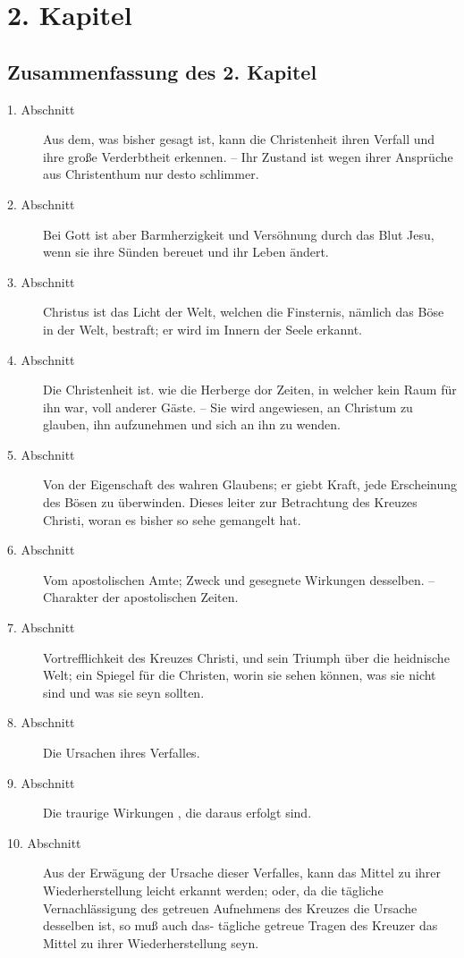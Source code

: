 
\chapter{2. Kapitel}


\section{Zusammenfassung des 2. Kapitel}
\footnotesize
\begin{description}
\item[1. Abschnitt] Aus dem, was bisher gesagt ist, kann die Christenheit ihren Verfall und ihre große Verderbtheit erkennen. – Ihr Zustand ist wegen ihrer Ansprüche aus Christenthum nur desto schlimmer.
\item[2. Abschnitt] Bei Gott ist aber Barmherzigkeit und Versöhnung durch das Blut Jesu, wenn sie ihre Sünden bereuet und ihr Leben ändert.
\item[3. Abschnitt] Christus ist das Licht der Welt, welchen die Finsternis, nämlich das Böse in der Welt, bestraft; er wird im Innern der Seele erkannt.
\item[4. Abschnitt] Die Christenheit ist. wie die Herberge dor Zeiten, in welcher kein Raum für ihn war, voll anderer Gäste. – Sie wird angewiesen, an Christum zu glauben, ihn aufzunehmen und sich an ihn zu wenden.
\item[5. Abschnitt] Von der Eigenschaft des wahren Glaubens; er giebt Kraft, jede Erscheinung des Bösen zu überwinden. Dieses leiter zur Betrachtung des Kreuzes Christi, woran es bisher so sehe gemangelt hat.
\item[6. Abschnitt] Vom apostolischen Amte; Zweck und gesegnete Wirkungen desselben. – Charakter der apostolischen Zeiten.
\item[7. Abschnitt] Vortrefflichkeit des Kreuzes Christi, und sein Triumph über die heidnische Welt; ein Spiegel für die Christen, worin sie sehen können, was sie nicht sind und was sie seyn sollten.
\item[8. Abschnitt] Die Ursachen ihres Verfalles.
\item[9. Abschnitt] Die traurige Wirkungen , die daraus erfolgt sind.
\item[10. Abschnitt] Aus der Erwägung der Ursache dieser Verfalles, kann das Mittel zu ihrer Wiederherstellung leicht erkannt werden; oder, da die tägliche Vernachlässigung des getreuen Aufnehmens des Kreuzes die Ursache desselben ist, so muß auch das- tägliche getreue Tragen des Kreuzer das Mittel zu ihrer Wiederherstellung seyn.
\end{description}
\normalsize

